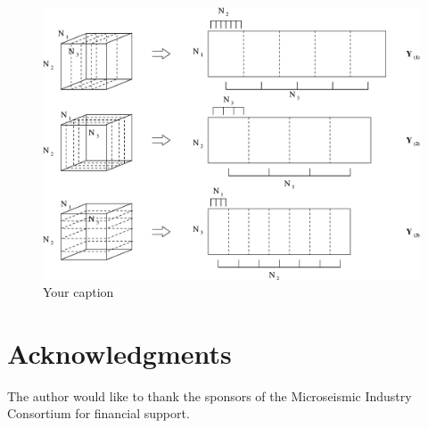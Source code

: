 \begin{figure}[htb]
\begin{center}
\includegraphics[width=0.7\linewidth,angle=0]{your_chapter_bibitem/fig1.eps}
\end{center}
\vspace{-4mm}
\caption{Your caption}
\label{fig:your_name_fig2}
\end{figure}
%


%
\section{Acknowledgments}
%
The author would like to thank the sponsors of the Microseismic Industry Consortium for financial support.
%

% 
\clearpage
\nocite{*}
 
